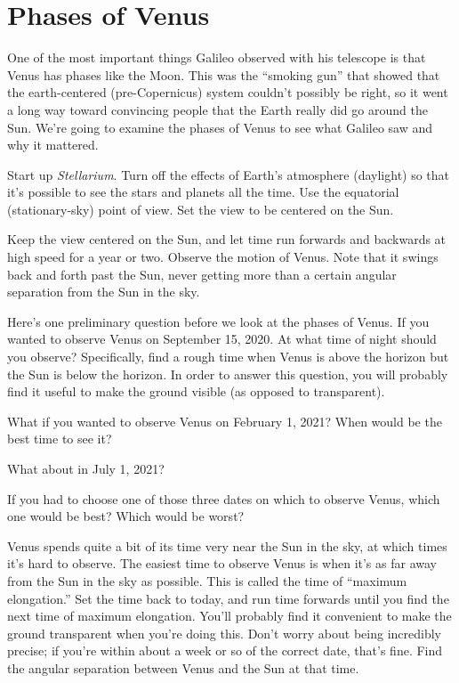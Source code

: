 \section{Phases of Venus}

\makelabheader 

One of the most important things Galileo observed with his telescope is that
Venus has phases like the Moon.   This was the ``smoking gun'' that showed
that the earth-centered (pre-Copernicus) system couldn't possibly be right,
so it went a long way toward convincing people that the Earth really did
go around the Sun.  We're going to examine the phases of Venus to see what
Galileo saw and why it mattered. 

Start up \textit{Stellarium}.
Turn off 
the effects of Earth's atmosphere (daylight)
so that it's possible to see the stars and planets all the time.
Use the equatorial (stationary-sky) point of view.
Set the view to be centered on the Sun.

Keep the view centered on the Sun, and let time run forwards and backwards 
at high speed for a year or two.
Observe the motion of Venus.  Note that it swings back and forth past the Sun,
never getting more than a certain angular separation from the Sun in the sky. 

Here's one preliminary question before we look at the phases of Venus.
If you wanted to observe Venus on September 15, 2020.
At what time of night should you
observe?  Specifically, find a rough time when Venus is above the
horizon but the Sun is below the horizon. In order to answer this
question, you will probably find it useful to make the ground visible (as
opposed to
transparent).



\answerspace{0.7in}

What if you wanted to observe Venus on February 1, 2021? When would be the
best time to see it?

\answerspace{ 0.7in}

What about in July 1, 2021?

\answerspace{ 0.7in}


If you had to choose one of those three dates on which to observe
Venus, which one would be best? Which would be worst?

\answerspace{ 0.7in}

\pagebreak[4]
Venus spends quite a bit of its time very near the Sun in the sky,
at which times it's hard to observe.
The easiest time to observe Venus is when it's as far away from
the Sun in the sky as possible.  This is called the time of ``maximum
elongation.''  Set the time back to today, 
and run time forwards until you find the next time of maximum
elongation. You'll probably find it convenient to make the ground transparent
when you're doing this.
Don't worry about being incredibly precise; if you're
within about a week or so of the correct date, that's fine.
Find the angular
separation between
Venus and the Sun at that time. 

